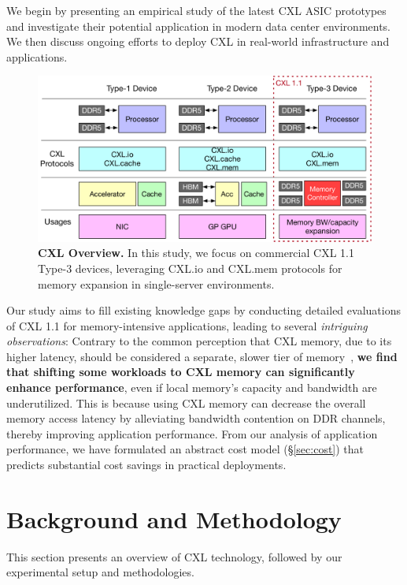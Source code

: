 We begin by presenting an empirical study of the latest CXL ASIC prototypes and investigate their potential application in modern data center environments. We then discuss ongoing efforts to deploy CXL in real-world infrastructure and applications.


\begin{figure}[t]
    \centering
      \includegraphics[width=\columnwidth]{fig/cxl/cxl.pdf}
      \caption[CXL Overview]{\textbf{CXL Overview.} In this study, we focus on commercial CXL 1.1 Type-3 devices, leveraging CXL.io and CXL.mem protocols for memory expansion in single-server environments.} 
    \label{fig:cxl1.1} 
    \end{figure}


Our study aims to fill existing knowledge gaps by conducting detailed evaluations of CXL 1.1 for memory-intensive applications, leading to several \textit{intriguing observations}:
Contrary to the common perception that CXL memory, due to its higher latency, should be considered a separate, slower tier of memory~\cite{pond,tpp}, \textbf{we find that shifting some workloads to CXL memory can significantly enhance performance}, even if local memory's capacity and bandwidth are underutilized. This is because using CXL memory can decrease the overall memory access latency by alleviating bandwidth contention on DDR channels, thereby improving application performance.
From our analysis of application performance, we have formulated an abstract cost model (\S\ref{sec:cost}) that predicts substantial cost savings in practical deployments.

\section{Background and Methodology}
\label{sec:background}

This section presents an overview of CXL technology, followed by our experimental setup and methodologies.

